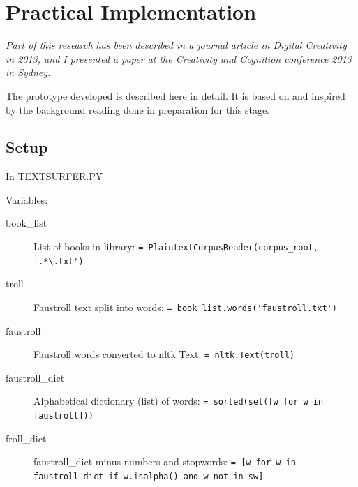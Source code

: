 
\chapter{Practical Implementation}
\label{ch:practical}

\emph{Part of this research has been described in a journal article in Digital Creativity in 2013, and I presented a paper at the Creativity and Cognition conference 2013 in Sydney.}

\grule{}

The prototype developed is described here in detail. It is based on and inspired by the background reading done in preparation for this stage.



\section{Setup}

In TEXTSURFER.PY

Variables:
\begin{description}
  \item [book\_list] List of books in library: \lstinline$= PlaintextCorpusReader(corpus_root, '.*\.txt')$%
  \item [troll] Faustroll text split into words: \lstinline$= book_list.words('faustroll.txt')$%
  \item [faustroll] Faustroll words converted to \gls{nltk} Text: \lstinline$= nltk.Text(troll)$
  \item [faustroll\_dict] Alphabetical dictionary (list) of words: \lstinline$= sorted(set([w for w in faustroll]))$
  \item [froll\_dict] faustroll\_dict minus numbers and stopwords: \lstinline$= [w for w in faustroll_dict if w.isalpha() and w not in sw]$%
\end{description}

